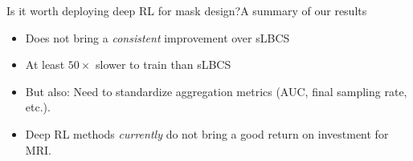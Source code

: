     \begin{frame}[t]{Is it worth deploying deep RL for mask design?}{A summary of our results}
            \begin{itemize}
                \item<1-> Does not bring a \textit{consistent} improvement over sLBCS
                \vfill\item<2-> At least $50\times$ slower to train than sLBCS
                \vfill\item<3-> But also: Need to standardize aggregation metrics (AUC, final sampling rate, etc.).
                \vfill\item<4->[$\Rightarrow$] Deep RL methods \textit{currently} do not bring a good return on investment for MRI.
            \end{itemize}
    \end{frame}
